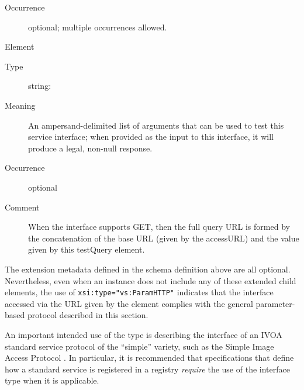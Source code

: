 \documentclass[11pt,a4paper]{ivoa}
\begin{document}
\begin{generated}
\begin{bigdescription}
\begin{description}
\item[Occurrence] optional; multiple occurrences allowed.

\end{description}
\item[Element \xmlel{testQuery}]
\begin{description}
\item[Type] string: 
\item[Meaning] 
                       An ampersand-delimited list of arguments that
                       can be used to test this service interface; 
                       when provided as the input to this interface,
                       it will produce a legal, non-null response.
                    
\item[Occurrence] optional
\item[Comment] 
                       When the interface supports GET, then the full 
                       query URL is formed by the concatenation of the 
                       base URL (given by the accessURL) and the value 
                       given by this testQuery element.  
                    

\end{description}


\end{bigdescription}\endgroup

\endgroup
\end{generated}


The extension metadata defined in the schema definition above are all
optional.  Nevertheless, even when an 
instance does not include any of these extended child elements, the
use of \verb|xsi:type="vs:ParamHTTP"| indicates that the interface
accessed via the URL given by the 
element complies with the general parameter-based protocol described
in this section.







An important intended use of the  type is
describing the interface of an IVOA standard service protocol 
of the ``simple'' variety, such as the Simple Image Access Protocol
\citep{2015ivoa.spec.1223D}.  In particular, it is recommended that
specifications that define how a standard service is registered in a
registry \emph{require} the use of the 
interface type when it is applicable.
\end{document}
